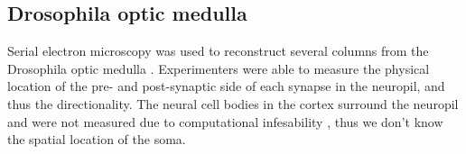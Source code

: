 \documentclass{article}
\begin{document}


\subsection{Drosophila optic medulla}
Serial electron microscopy was used to reconstruct several columns from the Drosophila optic medulla \autocite{Takemura2013}. Experimenters were able to measure the physical location of the pre- and post-synaptic side of each synapse in the neuropil, and thus the directionality. The neural cell bodies in the cortex surround the neuropil and were not measured due to computational infesability \autocite{MeinertzhagenPersonalComm}, thus we don't know the spatial location of the soma. 
\end{document}

